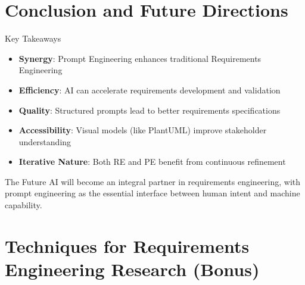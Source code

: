 \documentclass{beamer}
\begin{document}
\section{Conclusion and Future Directions}

\begin{frame}[t]{Key Takeaways}
    \begin{itemize}
        \item \textbf{Synergy}: Prompt Engineering enhances traditional Requirements Engineering
        \item \textbf{Efficiency}: AI can accelerate requirements development and validation
        \item \textbf{Quality}: Structured prompts lead to better requirements specifications
        \item \textbf{Accessibility}: Visual models (like PlantUML) improve stakeholder understanding
        \item \textbf{Iterative Nature}: Both RE and PE benefit from continuous refinement
    \end{itemize}
    
    \begin{block}{The Future}
        AI will become an integral partner in requirements engineering, with prompt engineering as the essential interface between human intent and machine capability.
    \end{block}
\end{frame}


\section{Techniques for Requirements Engineering Research (Bonus)}
\end{document}
